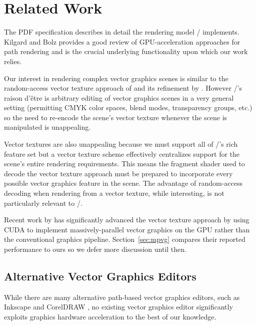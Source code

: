 
\section{Related Work}
\label{sec:relatedwork}

The PDF specification \cite{PDF-Spec} describes in detail the rendering model \Illustrator/ implements.
Kilgard and Bolz  provides a good review of GPU-acceleration approaches for path rendering
and is the crucial underlying functionality upon which our work relies.  

Our interest in rendering complex
vector graphics scenes is similar to the random-access vector texture approach of
\cite{Nehab:2008:RRG:1457515.1409088} and its refinement by \cite{Leben:Thesis:2010}.
However \Illustrator/'s raison d'\^{e}tre is arbitrary editing of vector graphics scenes in a very general
setting (permitting CMYK color spaces, blend modes, transparency groups, etc.) so the need to
re-encode the scene's vector texture whenever the scene is manipulated is unappealing.

Vector textures are also unappealing because we must support all of \Illustrator/'s rich feature set but
a vector texture scheme 
effectively centralizes support for the scene's entire rendering requirements.  This means
the fragment shader used to decode the vector texture approach
must be prepared to incorporate every possible vector graphics feature in the scene.
The advantage of random-access decoding when rendering from a vector texture, while interesting, is not particularly relevant
to \Illustrator/.

Recent work by \cite{GanEtAl14} has significantly advanced the vector texture approach by using CUDA
to implement massively-parallel vector graphics on the GPU
rather than the conventional graphics pipeline.
Section~\ref{sec:mpvg} compares their reported performance to ours so we defer more discussion until then.

\subsection{Alternative Vector Graphics Editors}

While there are many alternative path-based vector graphics editors, such as Inkscape \cite{kirsanov2009inkscape}
and CorelDRAW \cite{CorelDRAWbook},
no existing vector graphics editor significantly exploits graphics hardware
acceleration to the best of our knowledge.

